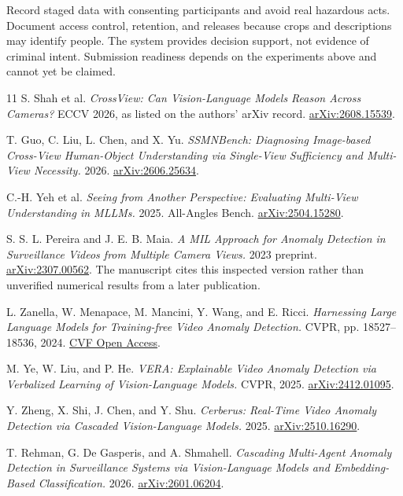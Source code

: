 \documentclass[10pt,a4paper]{article}
\begin{document}
Record staged data with consenting participants and avoid real hazardous acts. Document access control, retention, and releases because crops and descriptions may identify people. The system provides decision support, not evidence of criminal intent. Submission readiness depends on the experiments above and cannot yet be claimed.

\newpage
\begin{thebibliography}{11}
\setlength{\itemsep}{7pt}
\small
{} S. Shah et al. \emph{CrossView: Can Vision-Language Models Reason Across Cameras?} ECCV 2026, as listed on the authors' arXiv record. \href{https://arxiv.org/abs/2608.15539}{arXiv:2608.15539}.

 T. Guo, C. Liu, L. Chen, and X. Yu. \emph{SSMNBench: Diagnosing Image-based Cross-View Human-Object Understanding via Single-View Sufficiency and Multi-View Necessity.} 2026. \href{https://arxiv.org/abs/2606.25634}{arXiv:2606.25634}.

 C.-H. Yeh et al. \emph{Seeing from Another Perspective: Evaluating Multi-View Understanding in MLLMs.} 2025. All-Angles Bench. \href{https://arxiv.org/abs/2504.15280}{arXiv:2504.15280}.

 S. S. L. Pereira and J. E. B. Maia. \emph{A MIL Approach for Anomaly Detection in Surveillance Videos from Multiple Camera Views.} 2023 preprint. \href{https://arxiv.org/abs/2307.00562}{arXiv:2307.00562}. The manuscript cites this inspected version rather than unverified numerical results from a later publication.

 L. Zanella, W. Menapace, M. Mancini, Y. Wang, and E. Ricci. \emph{Harnessing Large Language Models for Training-free Video Anomaly Detection.} CVPR, pp. 18527--18536, 2024. \href{https://openaccess.thecvf.com/content/CVPR2024/html/Zanella_Harnessing_Large_Language_Models_for_Training-free_Video_Anomaly_Detection_CVPR_2024_paper.html}{CVF Open Access}.

 M. Ye, W. Liu, and P. He. \emph{VERA: Explainable Video Anomaly Detection via Verbalized Learning of Vision-Language Models.} CVPR, 2025. \href{https://arxiv.org/abs/2412.01095}{arXiv:2412.01095}.

 Y. Zheng, X. Shi, J. Chen, and Y. Shu. \emph{Cerberus: Real-Time Video Anomaly Detection via Cascaded Vision-Language Models.} 2025. \href{https://arxiv.org/abs/2510.16290}{arXiv:2510.16290}.

 T. Rehman, G. De Gasperis, and A. Shmahell. \emph{Cascading Multi-Agent Anomaly Detection in Surveillance Systems via Vision-Language Models and Embedding-Based Classification.} 2026. \href{https://arxiv.org/abs/2601.06204}{arXiv:2601.06204}.


\end{thebibliography}
\end{document}
